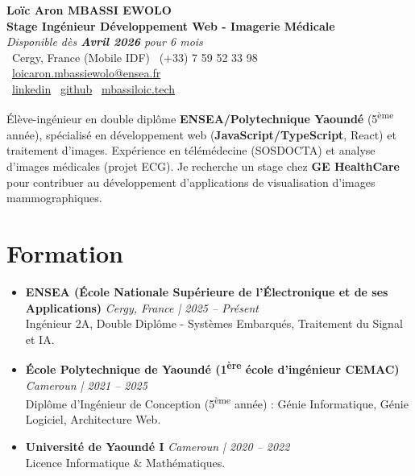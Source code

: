 \documentclass[a4paper,11pt]{article}
\begin{document}
\begin{center}
    {\Large \textbf{Loïc Aron MBASSI EWOLO}} \\ \vspace{4pt}
    \textbf{\large Stage Ingénieur Développement Web - Imagerie Médicale} \\
    \textit{\small Disponible dès \textbf{Avril 2026} pour 6 mois} \\ \vspace{4pt}
    \small
    \faMapMarker\ Cergy, France (Mobile IDF) \quad
    \faPhone\ (+33) 7 59 52 33 98 \quad
    \faEnvelope\ \href{mailto:loicaron.mbassiewolo@ensea.fr}{loicaron.mbassiewolo@ensea.fr} \\ \vspace{2pt}
    \faLinkedin\ \href{https://www.linkedin.com/in/loic-aron-mbassi-ewolo-3942a9246/}{linkedin} \quad
    \faGithub\ \href{https://github.com/Nameless0l}{github} \quad
    \faGlobe\ \href{https://mbassiloic.tech}{mbassiloic.tech}
\end{center}

\vspace{-6pt}

\noindent\small{Élève-ingénieur en double diplôme \textbf{ENSEA/Polytechnique Yaoundé} (5\textsuperscript{ème} année), spécialisé en développement web (\textbf{JavaScript/TypeScript}, React) et traitement d'images. Expérience en télémédecine (SOSDOCTA) et analyse d'images médicales (projet ECG). Je recherche un stage chez \textbf{GE HealthCare} pour contribuer au développement d'applications de visualisation d'images mammographiques.}

\section{Formation}
\begin{itemize}[leftmargin=*, label=\tiny$\bullet$, nosep]
    \item \textbf{ENSEA (École Nationale Supérieure de l'Électronique et de ses Applications)} \hfill \textit{Cergy, France | 2025 -- Présent} \\
    \small{Ingénieur 2A, Double Diplôme - Systèmes Embarqués, Traitement du Signal et IA.}
    \vspace{2pt}
    \item \textbf{École Polytechnique de Yaoundé (1\textsuperscript{ère} école d'ingénieur CEMAC)} \hfill \textit{Cameroun | 2021 -- 2025} \\
    \small{Diplôme d'Ingénieur de Conception (5\textsuperscript{ème} année) : Génie Informatique, Génie Logiciel, Architecture Web.}
    \item \textbf{Université de Yaoundé I} \hfill \textit{Cameroun | 2020 -- 2022} \\
    \small{Licence Informatique \& Mathématiques.}
\end{itemize}
\end{document}
